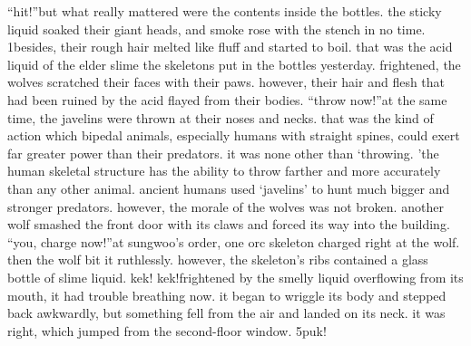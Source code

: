 “hit!”but what really mattered were the contents inside the bottles.
the sticky liquid soaked their giant heads, and smoke rose with the stench in no time.
1besides, their rough hair melted like fluff and started to boil.
 that was the acid liquid of the elder slime the skeletons put in the bottles yesterday.
frightened, the wolves scratched their faces with their paws.
 however, their hair and flesh that had been ruined by the acid flayed from their bodies.
“throw now!”at the same time, the javelins were thrown at their noses and necks.
that was the kind of action which bipedal animals, especially humans with straight spines, could exert far greater power than their predators.
 it was none other than ‘throwing.
’the human skeletal structure has the ability to throw farther and more accurately than any other animal.
 ancient humans used ‘javelins’ to hunt much bigger and stronger predators.
however, the morale of the wolves was not broken.
 another wolf smashed the front door with its claws and forced its way into the building.
“you, charge now!”at sungwoo’s order, one orc skeleton charged right at the wolf.
 then the wolf bit it ruthlessly.
however, the skeleton’s ribs contained a glass bottle of slime liquid.
kek! kek!frightened by the smelly liquid overflowing from its mouth, it had trouble breathing now.
it began to wriggle its body and stepped back awkwardly, but something fell from the air and landed on its neck.
 it was right, which jumped from the second-floor window.
5puk!

 